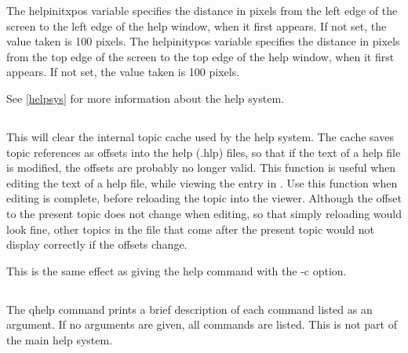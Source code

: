 The {\et helpinitxpos} variable specifies the distance in pixels from
the left edge of the screen to the left edge of the help window, when
it first appears.  If not set, the value taken is 100 pixels.  The
{\et helpinitypos} variable specifies the distance in pixels from the
top edge of the screen to the top edge of the help window, when it
first appears.  If not set, the value taken is 100 pixels.

See \ref{helpsys} for more information about the {\WRspice} help
system.

\subsection{}


This will clear the internal topic cache used by the help system.  The
cache saves topic references as offsets into the help ({\vt .hlp})
files, so that if the text of a help file is modified, the offsets are
probably no longer valid.  This function is useful when editing the
text of a help file, while viewing the entry in {\WRspice}.  Use this
function when editing is complete, before reloading the topic into the
viewer.  Although the offset to the present topic does not change when
editing, so that simply reloading would look fine, other topics in the
file that come after the present topic would not display correctly if
the offsets change.

This is the same effect as giving the {\cb help} command with the {\vt
-c} option.

\subsection{}


The {\cb qhelp} command prints a brief description of each command
listed as an argument.  If no arguments are given, all commands are
listed.  This is not part of the main help system.

\subsection{}

